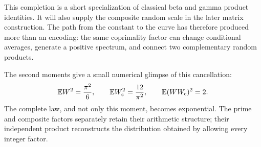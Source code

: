 This completion is a short specialization of classical beta and gamma
product identities.  It will also supply the composite random scale
in the later matrix construction.  The path from the constant to the
curve has therefore produced more than an encoding: the same
coprimality factor can change conditional averages, generate a
positive spectrum, and connect two complementary random products.

The second moments give a small numerical glimpse of this cancellation:
\[
 \mathbb E W^2=\frac{\pi^2}{6},\qquad
 \mathbb E W_{\mathrm c}^2=\frac{12}{\pi^2},\qquad
 \mathbb E(WW_{\mathrm c})^2=2.
\]
The complete law, and not only this moment, becomes exponential.
The prime and composite factors separately retain their arithmetic
structure; their independent product reconstructs the distribution
obtained by allowing every integer factor.
